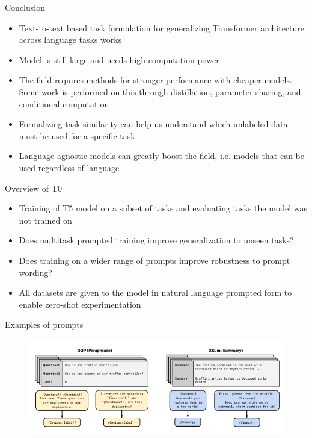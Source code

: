 \documentclass[english]{mlutalk}
\begin{document}
\begin{frame}{Conclusion}
    \begin{itemize}
      \item Text-to-text based task formulation for generalizing Transformer architecture across language tasks works
      \item Model is still large and needs high computation power
      \item The field requires methods for stronger performance with cheaper models. Some work is performed on this through distillation, parameter sharing, and conditional computation
      \item  Formalizing task similarity can help us understand which unlabeled data must be used for a specific task
      \item Language-agnostic models can greatly boost the field, i.e. models that can be used regardless of language
    \end{itemize}
\end{frame}

\begin{frame}{Overview of T0~\cite{SanhWRBSACSLRDBXTSSKCNDCJWMSYPBWNRSSFFTBGBWR2021}}
    \begin{itemize}
      \item Training of T5 model on a subset of tasks and evaluating tasks the model was not trained on
      \item Does multitask prompted training improve generalization to unseen tasks?
      \item Does training on a wider range of prompts improve robustness to prompt wording?
      \item All datasets are given to the model in natural language prompted form to enable zero-shot experimentation
    \end{itemize}
\end{frame}

\begin{frame}{Examples of prompts}
    \begin{figure}
      \center
      \includegraphics[scale=0.5]{figures/prompts.png}
    \end{figure}
\end{frame}
\end{document}
